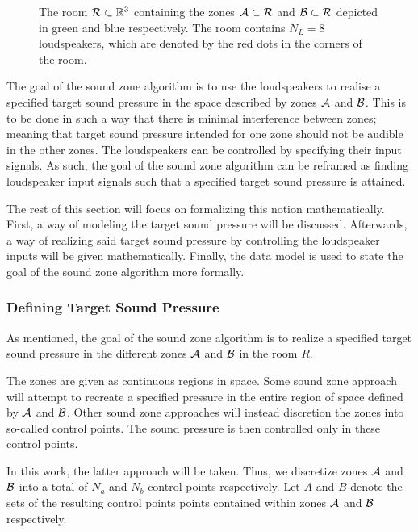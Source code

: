 \begin{figure}[t]
    \centering
    
    \caption{The room $\mathcal{R}\subset \mathbb{R}^{3}$ containing the zones $\mathcal{A}\subset\mathcal{R}$ 
    and $\mathcal{B}\subset\mathcal{R}$ depicted in green and blue respectively. 
    The room contains $N_L = 8$ loudspeakers, which are denoted by the red dots in the corners of the room.}
\end{figure}

The goal of the sound zone algorithm is to use the loudspeakers to realise a specified target sound pressure
in the space described by zones $\mathcal{A}$ and $\mathcal{B}$.
This is to be done in such a way that there is minimal interference between zones; 
meaning that target sound pressure intended for one zone should not be audible in the other zones.
The loudspeakers can be controlled by specifying their input signals.
As such, the goal of the sound zone algorithm can be reframed as finding loudspeaker input signals such that a specified target sound pressure is attained.

The rest of this section will focus on formalizing this notion mathematically.
First, a way of modeling the target sound pressure will be discussed.
Afterwards, a way of realizing said target sound pressure by controlling the loudspeaker inputs will be given mathematically.
Finally, the data model is used to state the goal of the sound zone algorithm more formally.

\subsubsection{Defining Target Sound Pressure}
As mentioned, the goal of the sound zone algorithm is to realize a specified target sound pressure
in the different zones $\mathcal{A}$ and $\mathcal{B}$ in the room $R$.

The zones are given as continuous regions in space.
Some sound zone approach will attempt to recreate a specified pressure in the entire region of space defined by $\mathcal{A}$ and $\mathcal{B}$.
Other sound zone approaches will instead discretion the zones into so-called control points.
The sound pressure is then controlled only in these control points.

In this work, the latter approach will be taken.
Thus, we discretize zones $\mathcal{A}$ and $\mathcal{B}$ into a total of $N_a$ and $N_b$ control points respectively.   
Let $A$ and $B$ denote the sets of the resulting control points points contained within zones $\mathcal{A}$ and $\mathcal{B}$ respectively.



